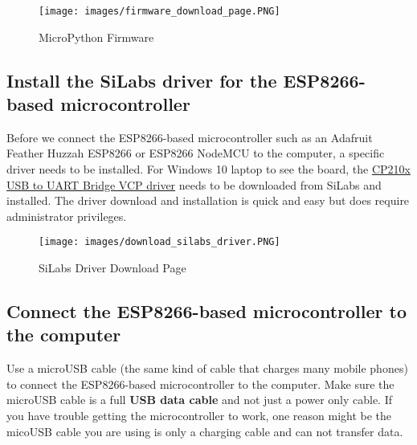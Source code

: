 \documentclass{book}
\makeatletter
\def\maxwidth{\ifdim\Gin@nat@width>\linewidth\linewidth
\else\Gin@nat@width\fi}
\let\Oldincludegraphics\includegraphics
\renewcommand{\includegraphics}[1]{\Oldincludegraphics[width=.8\maxwidth]{#1}}
\makeatother
\begin{document}
\begin{figure}
\centering
\texttt{[image: images/firmware\_download\_page.PNG]}
\caption{MicroPython Firmware}
\end{figure}
    




    
        \hypertarget{install-the-silabs-driver-for-the-esp8266-based-microcontroller}{%
\subsection{Install the SiLabs driver for the ESP8266-based
microcontroller}\label{install-the-silabs-driver-for-the-esp8266-based-microcontroller}}
    




    
        Before we connect the ESP8266-based microcontroller such as an Adafruit
Feather Huzzah ESP8266 or ESP8266 NodeMCU to the computer, a specific
driver needs to be installed. For Windows 10 laptop to see the board,
the
\href{https://www.silabs.com/products/development-tools/software/usb-to-uart-bridge-vcp-drivers}{CP210x
USB to UART Bridge VCP driver} needs to be downloaded from SiLabs and
installed. The driver download and installation is quick and easy but
does require administrator privileges.

\begin{figure}
\centering
\texttt{[image: images/download\_silabs\_driver.PNG]}
\caption{SiLabs Driver Download Page}
\end{figure}
    




    
        \hypertarget{connect-the-esp8266-based-microcontroller-to-the-computer}{%
\subsection{Connect the ESP8266-based microcontroller to the
computer}\label{connect-the-esp8266-based-microcontroller-to-the-computer}}
    




    
        Use a microUSB cable (the same kind of cable that charges many mobile
phones) to connect the ESP8266-based microcontroller to the computer.
Make sure the microUSB cable is a full \textbf{USB data cable} and not
just a power only cable. If you have trouble getting the microcontroller
to work, one reason might be the micoUSB cable you are using is only a
charging cable and can not transfer data.
    
\end{document}
